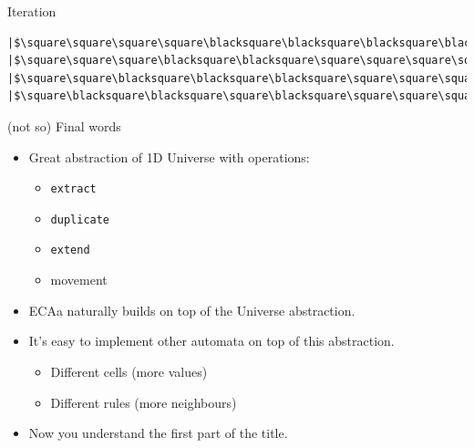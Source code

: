 \documentclass[presentation,aspectratio=169,smaller]{beamer}
\begin{document}
\begin{frame}[label={sec:orge2a38fd},fragile]{Iteration}
\begin{verbatim}
|$\square\square\square\square\blacksquare\blacksquare\blacksquare\blacksquare\blacksquare\blacksquare\blacksquare\blacksquare\square\blacksquare\blacksquare\square\square\square\blacksquare\blacksquare\blacksquare\square\square\square\square\square\square\square\square\square\square\square\square\square\square\square\square\square\square\square\square$|
|$\square\square\square\blacksquare\blacksquare\square\square\square\square\square\square\blacksquare\blacksquare\blacksquare\blacksquare\square\square\blacksquare\blacksquare\square\blacksquare\square\square\square\square\square\square\square\square\square\square\square\square\square\square\square\square\square\square\square\square$|
|$\square\square\blacksquare\blacksquare\blacksquare\square\square\square\square\square\blacksquare\blacksquare\square\square\blacksquare\square\blacksquare\blacksquare\blacksquare\blacksquare\blacksquare\square\square\square\square\square\square\square\square\square\square\square\square\square\square\square\square\square\square\square\square$|
|$\square\blacksquare\blacksquare\square\blacksquare\square\square\square\square\blacksquare\blacksquare\blacksquare\square\blacksquare\blacksquare\blacksquare\blacksquare\square\square\square\blacksquare\square\square\square\square\square\square\square\square\square\square\square\square\square\square\square\square\square\square\square\square$|
\end{verbatim}
\end{frame}

\begin{frame}[label={sec:org9dfe46e},fragile]{(not so) Final words}
 \begin{itemize}
\item <1-> Great abstraction of 1D Universe with operations:
\begin{itemize}
\item \texttt{extract}
\item \texttt{duplicate}
\item \texttt{extend}
\item movement
\end{itemize}
\item <2-> ECAa naturally builds on top of the Universe abstraction.
\item <3-> It's easy to implement other automata on top of this abstraction.
\begin{itemize}
\item Different cells (more values)
\item Different rules (more neighbours)
\end{itemize}
\item <4-> Now you understand the first part of the title.
\end{itemize}
\end{frame}
\end{document}
